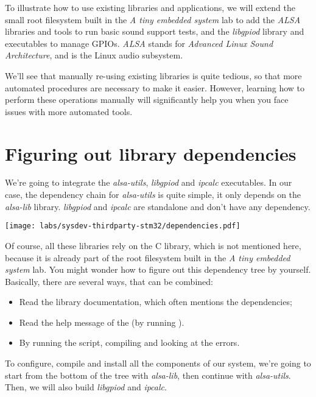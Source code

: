 
To illustrate how to use existing libraries and applications, we will
extend the small root filesystem built in the {\em A tiny embedded
system} lab to add the {\em ALSA} libraries and tools to run
basic sound support tests, and the {\em libgpiod} library and
executables to manage GPIOs. {\em ALSA} stands for {\em Advanced Linux
Sound Architecture}, and is the Linux audio subsystem.

We'll see that manually re-using existing libraries is quite tedious,
so that more automated procedures are necessary to make it
easier. However, learning how to perform these operations manually
will significantly help you when you face issues with more
automated tools.

\section{Figuring out library dependencies}

We're going to integrate the {\em alsa-utils}, {\em libgpiod}
and {\em ipcalc} executables. In our case, the dependency chain
for {\em alsa-utils} is quite simple, it only depends on the
{\em alsa-lib} library. {\em libgpiod} and {\em ipcalc} are standalone
and don't have any dependency.

\texttt{[image: labs/sysdev-thirdparty-stm32/dependencies.pdf]}

Of course, all these libraries rely on the C library, which is not
mentioned here, because it is already part of the root filesystem
built in the {\em A tiny embedded system} lab. You might wonder how to
figure out this dependency tree by yourself. Basically, there are
several ways, that can be combined:

\begin{itemize}
\item Read the library documentation, which often mentions the
  dependencies;
\item Read the help message of the  (by running
  ).
\item By running the  script, compiling and looking
  at the errors.
\end{itemize}

To configure, compile and install all the components of our system,
we're going to start from the bottom of the tree with {\em alsa-lib},
then continue with {\em alsa-utils}. Then, we will also build
{\em libgpiod} and {\em ipcalc}.

